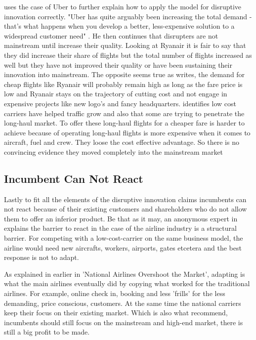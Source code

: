 \documentclass[a4paper, 11pt]{article}
\begin{document}
\citep{Christensen2015} uses the case of Uber to further explain how to apply the model for disruptive innovation correctly. "Uber has quite arguably been increasing the total demand - that's what happens when you develop a better, less-expensive solution to a widespread customer need" \citep[p. 4]{Christensen2015}. He then continues that disrupters are not mainstream until increase their quality. Looking at Ryanair it is fair to say that they did increase their share of flights but the total number of flights increased as well \citep{Eurocontrol2018} but they have not improved their quality or have been sustaining their innovation into mainstream. The opposite seems true as \citep{Barrett} writes, the demand for cheap flights like Ryanair will probably remain high as long as the fare price is low and Ryanair stays on the trajectory of cutting cost and not engage in expensive projects like new logo's and fancy headquarters. \cite{Eurocontrol2018} identifies low cost carriers have helped traffic grow and also that some are trying to penetrate the long-haul market. To offer these long-haul flights for a cheaper fare is harder to achieve because of operating long-haul flights is more expensive when it comes to aircraft, fuel and crew. They loose the cost effective advantage. So there is no convincing evidence they moved completely into the mainstream market


\subsection{Incumbent Can Not React}
\label{reaction}

Lastly to fit all the elements of the disruptive innovation \cite{Christensen97} claims incumbents can not react because of their existing customers and shareholders who do not allow them to offer an inferior product.
Be that as it may, an anonymous expert in \cite{King} explains the barrier to react in the case of the airline industry is a structural barrier. For competing with a low-cost-carrier on the same business model, the airline would need new aircrafts, workers, airports, gates etcetera and the best response is not to adapt.

As explained in earlier in 'National Airlines Overshoot the Market', adapting is what the main airlines eventually did by copying what worked for the traditional airlines. For example, online check in, booking and less 'frills' for the less demanding, price conscious, customers. At the same time the national carriers keep their focus on their existing market. Which is also what \cite{Christensen2015} recommend, incumbents should still focus on the mainstream and high-end  market, there is still a big profit to be made.
\end{document}
